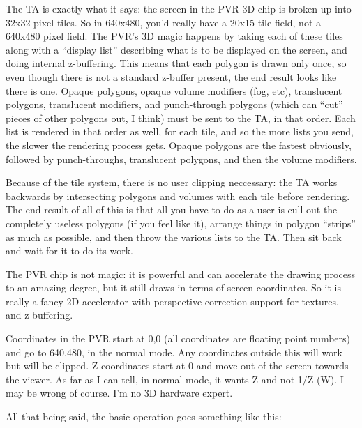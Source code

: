 \documentclass[english]{report}
\begin{document}
The TA is exactly what it says: the screen in the PVR 3D chip is broken
up into 32x32 pixel tiles. So in 640x480, you'd really have a 20x15
tile field, not a 640x480 pixel field. The PVR's 3D magic happens
by taking each of these tiles along with a ``display list'' describing
what is to be displayed on the screen, and doing internal z-buffering.
This means that each polygon is drawn only once, so even though there
is not a standard z-buffer present, the end result looks like there
is one. Opaque polygons, opaque volume modifiers (fog, etc), translucent
polygons, translucent modifiers, and punch-through polygons (which
can ``cut'' pieces of other polygons out, I think) must be sent
to the TA, in that order. Each list is rendered in that order as well,
for each tile, and so the more lists you send, the slower the rendering
process gets. Opaque polygons are the fastest obviously, followed
by punch-throughs, translucent polygons, and then the volume modifiers. 

Because of the tile system, there is no user clipping neccessary:
the TA works backwards by intersecting polygons and volumes with each
tile before rendering. The end result of all of this is that all you
have to do as a user is cull out the completely useless polygons (if
you feel like it), arrange things in polygon ``strips'' as much
as possible, and then throw the various lists to the TA. Then sit
back and wait for it to do its work.

The PVR chip is not magic: it is powerful and can accelerate the drawing
process to an amazing degree, but it still draws in terms of screen
coordinates. So it is really a fancy 2D accelerator with perspective
correction support for textures, and z-buffering.

Coordinates in the PVR start at 0,0 (all coordinates are floating
point numbers) and go to 640,480, in the normal mode. Any coordinates
outside this will work but will be clipped. Z coordinates start at
0 and move out of the screen towards the viewer. As far as I can tell,
in normal mode, it wants Z and not 1/Z (W). I may be wrong of course.
I'm no 3D hardware expert.

All that being said, the basic operation goes something like this:
\end{document}
